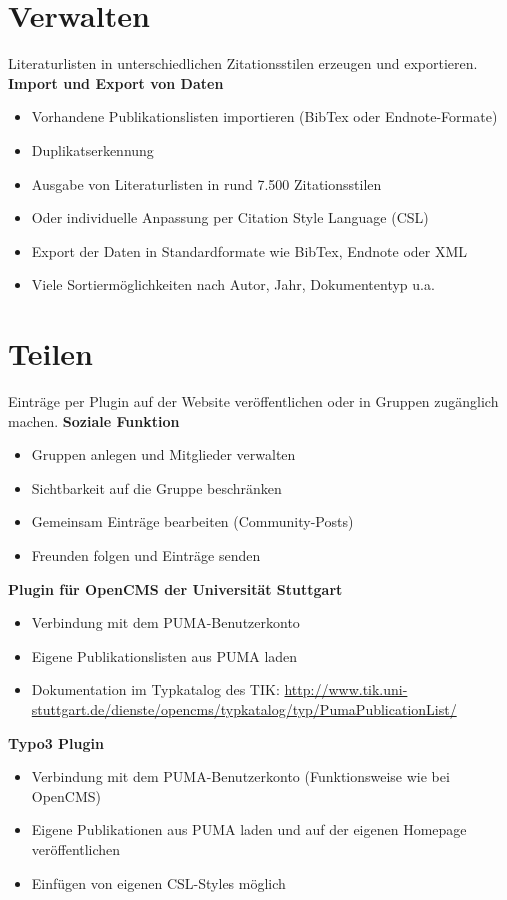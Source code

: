 \section{Verwalten}
Literaturlisten in unterschiedlichen Zitationsstilen erzeugen und exportieren.\newline\newline
\textbf{Import und Export von Daten}
\begin{itemize}
\item Vorhandene Publikationslisten importieren (BibTex oder Endnote-Formate)
\item Duplikatserkennung
\item Ausgabe von Literaturlisten in rund 7.500 Zitationsstilen
\item Oder individuelle Anpassung per Citation Style Language (CSL)
\item Export der Daten in Standardformate wie BibTex, Endnote oder XML
\item Viele Sortiermöglichkeiten nach Autor, Jahr, Dokumententyp u.a.
\end{itemize}
\section{Teilen}
Einträge per Plugin auf der Website veröffentlichen oder in Gruppen zugänglich machen.\newline\newline
\textbf{Soziale Funktion}
\begin{itemize}
\item Gruppen anlegen und Mitglieder verwalten
\item Sichtbarkeit auf die Gruppe beschränken
\item Gemeinsam Einträge bearbeiten (Community-Posts)
\item Freunden folgen und Einträge senden
\end{itemize}
\textbf{Plugin für OpenCMS der Universität Stuttgart}
\begin{itemize}
\item Verbindung mit dem PUMA-Benutzerkonto
\item Eigene Publikationslisten aus PUMA laden
\item Dokumentation im Typkatalog des TIK: \url{http://www.tik.uni-stuttgart.de/dienste/opencms/typkatalog/typ/PumaPublicationList/}
\end{itemize} 
\textbf{Typo3 Plugin}
\begin{itemize}
\item Verbindung mit dem PUMA-Benutzerkonto (Funktionsweise wie bei OpenCMS)
\item Eigene Publikationen aus PUMA laden und auf der eigenen Homepage veröffentlichen
\item Einfügen von eigenen CSL-Styles möglich
\end{itemize}